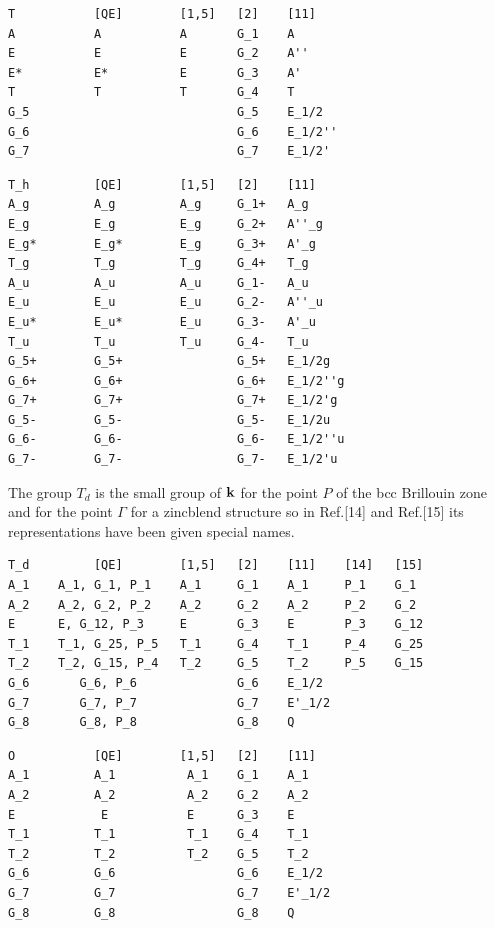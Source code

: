 \documentclass[12pt,a4paper]{article}
\begin{document}
\begin{verbatim}
T           [QE]        [1,5]   [2]    [11]
A           A           A       G_1    A
E           E           E       G_2    A''
E*          E*          E       G_3    A'
T           T           T       G_4    T
G_5                             G_5    E_1/2
G_6                             G_6    E_1/2''
G_7                             G_7    E_1/2'
\end{verbatim}

\begin{verbatim}
T_h         [QE]        [1,5]   [2]    [11]
A_g         A_g         A_g     G_1+   A_g
E_g         E_g         E_g     G_2+   A''_g
E_g*        E_g*        E_g     G_3+   A'_g
T_g         T_g         T_g     G_4+   T_g
A_u         A_u         A_u     G_1-   A_u
E_u         E_u         E_u     G_2-   A''_u
E_u*        E_u*        E_u     G_3-   A'_u
T_u         T_u         T_u     G_4-   T_u
G_5+        G_5+                G_5+   E_1/2g
G_6+        G_6+                G_6+   E_1/2''g 
G_7+        G_7+                G_7+   E_1/2'g
G_5-        G_5-                G_5-   E_1/2u
G_6-        G_6-                G_6-   E_1/2''u
G_7-        G_7-                G_7-   E_1/2'u
\end{verbatim}

The group $T_d$ is the small group of ${\bf k}$ for the point $P$ of the
bcc Brillouin zone and for the point $\Gamma$ for a zincblend structure
so in Ref.[14] and Ref.[15] its representations have been given 
special names. 
\begin{verbatim}
T_d         [QE]        [1,5]   [2]    [11]    [14]   [15]
A_1    A_1, G_1, P_1    A_1     G_1    A_1     P_1    G_1
A_2    A_2, G_2, P_2    A_2     G_2    A_2     P_2    G_2
E      E, G_12, P_3     E       G_3    E       P_3    G_12
T_1    T_1, G_25, P_5   T_1     G_4    T_1     P_4    G_25
T_2    T_2, G_15, P_4   T_2     G_5    T_2     P_5    G_15
G_6       G_6, P_6              G_6    E_1/2
G_7       G_7, P_7              G_7    E'_1/2
G_8       G_8, P_8              G_8    Q
\end{verbatim}

\begin{verbatim}
O           [QE]        [1,5]   [2]    [11]
A_1         A_1          A_1    G_1    A_1
A_2         A_2          A_2    G_2    A_2
E            E           E      G_3    E
T_1         T_1          T_1    G_4    T_1
T_2         T_2          T_2    G_5    T_2
G_6         G_6                 G_6    E_1/2
G_7         G_7                 G_7    E'_1/2
G_8         G_8                 G_8    Q
\end{verbatim}
\end{document}
